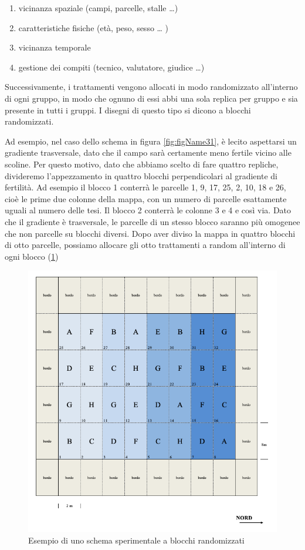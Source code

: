\documentclass[a4paper,12pt,oneside]{book}
\providecommand{\tightlist}{%
  \setlength{\itemsep}{0pt}\setlength{\parskip}{0pt}}
\begin{document}
\begin{enumerate}
\def\labelenumi{\arabic{enumi}.}
\tightlist
\item
  vicinanza spaziale (campi, parcelle, stalle \ldots{})
\item
  caratteristiche fisiche (età, peso, sesso \ldots{} )
\item
  vicinanza temporale
\item
  gestione dei compiti (tecnico, valutatore, giudice \ldots{})
\end{enumerate}

Successivamente, i trattamenti vengono allocati in modo randomizzato all'interno di ogni gruppo, in modo che ognuno di essi abbi una sola replica per gruppo e sia presente in tutti i gruppi. I disegni di questo tipo si dicono a blocchi randomizzati.

Ad esempio, nel caso dello schema in figura \ref{fig:figName31}, è lecito aspettarsi un gradiente trasversale, dato che il campo sarà certamente meno fertile vicino alle scoline. Per questo motivo, dato che abbiamo scelto di fare quattro repliche, divideremo l'appezzamento in quattro blocchi perpendicolari al gradiente di fertilità. Ad esempio il blocco 1 conterrà le parcelle 1, 9, 17, 25, 2, 10, 18 e 26, cioè le prime due colonne della mappa, con un numero di parcelle esattamente uguali al numero delle tesi. Il blocco 2 conterrà le colonne 3 e 4 e così via. Dato che il gradiente è trasversale, le parcelle di un stesso blocco saranno più omogenee che non parcelle su blocchi diversi. Dopo aver diviso la mappa in quattro blocchi di otto parcelle, possiamo allocare gli otto trattamenti a random all'interno di ogni blocco (\ref{fig:figName34})

\begin{figure}

{\centering \includegraphics[width=0.9\linewidth]{_images/Mappa1CRBD} 

}

\caption{Esempio di uno schema sperimentale a blocchi randomizzati}\label{fig:figName34}
\end{figure}
\end{document}
